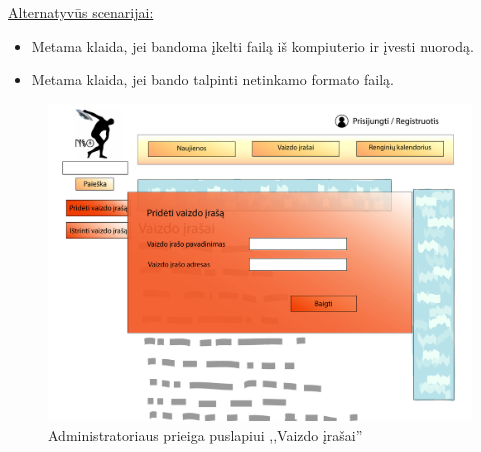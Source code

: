 \documentclass{VUMIFPSkursinis}
\begin{document}
\begin{enumerate} [label = \textbf{U\arabic*.}]
					\underline{Alternatyvūs scenarijai:}
					\begin{itemize}
						\item Metama klaida, jei bandoma įkelti failą iš kompiuterio ir įvesti nuorodą.
						\item Metama klaida, jei bando talpinti netinkamo formato failą.
					\end{itemize}
				
					\begin{figure}[H]
						\centering
						\includegraphics[width=\textwidth]{img/PSI4/AdminVaizdoirasai-01.jpg}
						\caption{Administratoriaus prieiga puslapiui ,,Vaizdo įrašai''}
						\label{fig:uzd_admin_vaizdoIrasas}
					\end{figure}
				

\end{enumerate}
\end{document}
